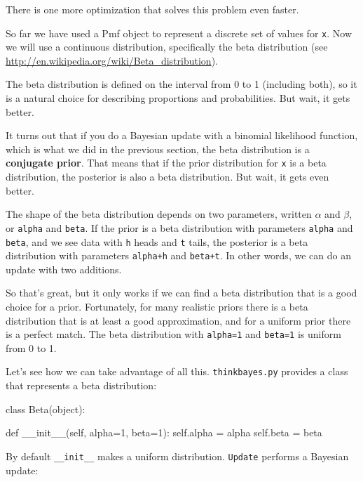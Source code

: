 \documentclass[12pt]{book}
\theoremstyle{exercise}
\begin{document}
There is one more optimization that solves this problem
even faster.

So far we have used a Pmf object to represent a discrete set of
values for {\tt x}.  Now we will use a continuous
distribution, specifically the beta distribution (see
\url{http://en.wikipedia.org/wiki/Beta_distribution}).

The beta distribution is defined on the interval from 0 to 1
(including both), so it is a natural choice for describing
proportions and probabilities.  But wait, it gets better.


It turns out that if you do a Bayesian update with a binomial
likelihood function, which is what we did in the previous section, the beta
distribution is a {\bf conjugate prior}.  That means that if the prior
distribution for {\tt x} is a beta distribution, the posterior is also
a beta distribution.  But wait, it gets even better.

The shape of the beta distribution depends on two parameters, written
$\alpha$ and $\beta$, or {\tt alpha} and {\tt beta}.  If the prior
is a beta distribution with parameters {\tt alpha} and {\tt beta}, and
we see data with {\tt h} heads and {\tt t} tails, the posterior is a
beta distribution with parameters {\tt alpha+h} and {\tt beta+t}.  In
other words, we can do an update with two additions.

So that's great, but it only works if we can find a beta distribution
that is a good choice for a prior.  Fortunately, for many realistic
priors there is a beta distribution that is at least a good
approximation, and for a uniform prior there is a perfect match.  The
beta distribution with {\tt alpha=1} and {\tt beta=1} is uniform from
0 to 1.

Let's see how we can take advantage of all this.  
{\tt thinkbayes.py} provides 
a class that represents a beta distribution:

\begin{code}
class Beta(object):

    def __init__(self, alpha=1, beta=1):
        self.alpha = alpha
        self.beta = beta
\end{code}

By default \verb"__init__" makes a uniform distribution.
{\tt Update} performs a Bayesian update:
\end{document}
